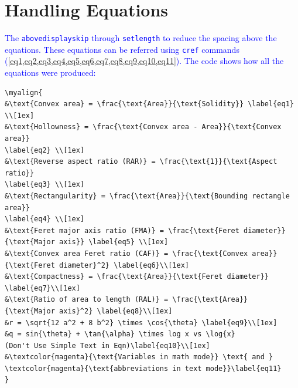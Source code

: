 \documentclass[phd,showframe]{ndsu-thesis-2022}
\newcommand\italk[1]{\textcolor{blue}{#1}}  %
\begin{document}
\mysectop
\section{Handling Equations}
\italk{The \texttt{abovedisplayskip} through \texttt{setlength} to reduce the spacing above the equations. These equations can be referred using \texttt{cref} commands (\cref{eq1,eq2,eq3,eq4,eq5,eq6,eq7,eq8,eq9,eq10,eq11}). The code shows how all the equations were produced:}

\vspace{1ex}
{\singlespacing
\begin{verbatim}
\myalign{
&\text{Convex area} = \frac{\text{Area}}{\text{Solidity}} \label{eq1} \\[1ex]
&\text{Hollowness} = \frac{\text{Convex area - Area}}{\text{Convex area}} 
\label{eq2} \\[1ex]
&\text{Reverse aspect ratio (RAR)} = \frac{\text{1}}{\text{Aspect ratio}} 
\label{eq3} \\[1ex]
&\text{Rectangularity} = \frac{\text{Area}}{\text{Bounding rectangle area}} 
\label{eq4} \\[1ex]
&\text{Feret major axis ratio (FMA)} = \frac{\text{Feret diameter}}
{\text{Major axis}} \label{eq5} \\[1ex]
&\text{Convex area Feret ratio (CAF)} = \frac{\text{Convex area}}
{\text{Feret diameter}^2} \label{eq6}\\[1ex]
&\text{Compactness} = \frac{\text{Area}}{\text{Feret diameter}} 
\label{eq7}\\[1ex]
&\text{Ratio of area to length (RAL)} = \frac{\text{Area}}
{\text{Major axis}^2} \label{eq8}\\[1ex]
&r = \sqrt{12 a^2 + 8 b^2} \times \cos{\theta} \label{eq9}\\[1ex]
&q = sin{\theta} + \tan{\alpha} \times log x vs \log{x} 
(Don't Use Simple Text in Eqn)\label{eq10}\\[1ex]
&\textcolor{magenta}{\text{Variables in math mode}} \text{ and }  
\textcolor{magenta}{\text{abbreviations in text mode}}\label{eq11}
}
\end{verbatim}
}
\end{document}
